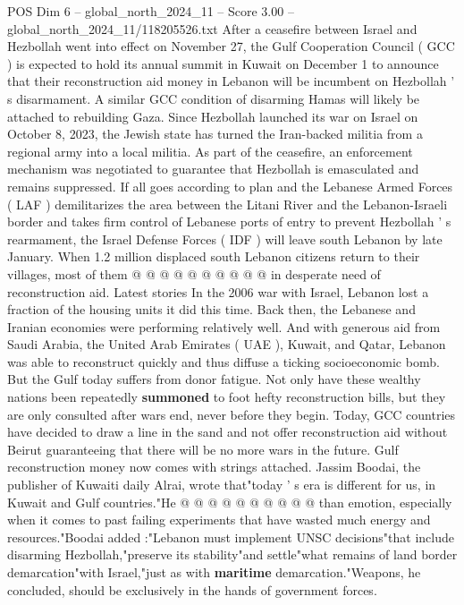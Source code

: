 \begin{textsample}{POS Dim 6 – global\_north\_2024\_11 – Score 3.00 – global\_north\_2024\_11/118205526.txt}  \label{ex:f6_pos_359}
After a ceasefire between Israel and Hezbollah went into effect on November 27, the Gulf Cooperation Council ( GCC ) is expected to hold its annual summit in Kuwait on December 1 to announce that their reconstruction aid money in Lebanon will be incumbent on Hezbollah ' s disarmament.
A similar GCC condition of disarming Hamas will likely be attached to rebuilding Gaza.
Since Hezbollah launched its war on Israel on October 8, 2023, the Jewish state has turned the Iran-backed militia from a regional army into a local militia.
As part of the ceasefire, an enforcement mechanism was negotiated to guarantee that Hezbollah is emasculated and remains suppressed.
If all goes according to plan and the Lebanese Armed Forces ( LAF ) demilitarizes the area between the Litani River and the Lebanon-Israeli border and takes firm control of Lebanese ports of entry to prevent Hezbollah ' s rearmament, the Israel Defense Forces ( IDF ) will leave south Lebanon by late January.
When 1.2 million displaced south Lebanon citizens return to their villages, most of them @ @ @ @ @ @ @ @ @ @ in desperate need of reconstruction aid.
Latest stories In the 2006 war with Israel, Lebanon lost a fraction of the housing units it did this time.
Back then, the Lebanese and Iranian economies were performing relatively well.
And with generous aid from Saudi Arabia, the United Arab Emirates ( UAE ), Kuwait, and Qatar, Lebanon was able to reconstruct quickly and thus diffuse a ticking socioeconomic bomb.
But the Gulf today suffers from donor fatigue.
Not only have these wealthy nations been repeatedly \textbf{summoned} to foot hefty reconstruction bills, but they are only consulted after wars end, never before they begin.
Today, GCC countries have decided to draw a line in the sand and not offer reconstruction aid without Beirut guaranteeing that there will be no more wars in the future.
Gulf reconstruction money now comes with strings attached.
Jassim Boodai, the publisher of Kuwaiti daily Alrai, wrote that"today ' s era is different for us, in Kuwait and Gulf countries."He @ @ @ @ @ @ @ @ @ @ than emotion, especially when it comes to past failing experiments that have wasted much energy and resources."Boodai added :"Lebanon must implement UNSC decisions"that include disarming Hezbollah,"preserve its stability"and settle"what remains of land border demarcation"with Israel,"just as with \textbf{maritime} demarcation."Weapons, he concluded, should be exclusively in the hands of government forces.

\end{textsample}
